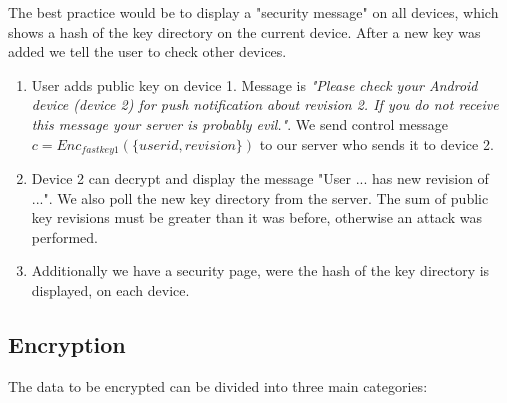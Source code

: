 \documentclass{scrartcl}
\begin{document}
The best practice would be to display a "security message" on all devices, which shows a hash of the key directory on the current device. After a new key was added we tell the user to check other devices.
\begin{enumerate}
\item User adds public key on device 1. Message is \textit{"Please check your Android device (device 2) for push notification about revision 2. If you do not receive this message your server is probably evil."}. We send control message $c = Enc_{fastkey1}(\lbrace userid, revision\rbrace )$ to our server who sends it to device 2.
\item  Device 2 can decrypt and display the message "User ... has new revision of ...". We also poll the new key directory from the server. The sum of public key revisions must be greater than it was before, otherwise an attack was performed. 
\item Additionally we have a security page, were the hash of the key directory is displayed, on each device.
\end{enumerate}






  
 \subsection{Encryption}
The data to be encrypted can be divided into three main categories:
\end{document}
